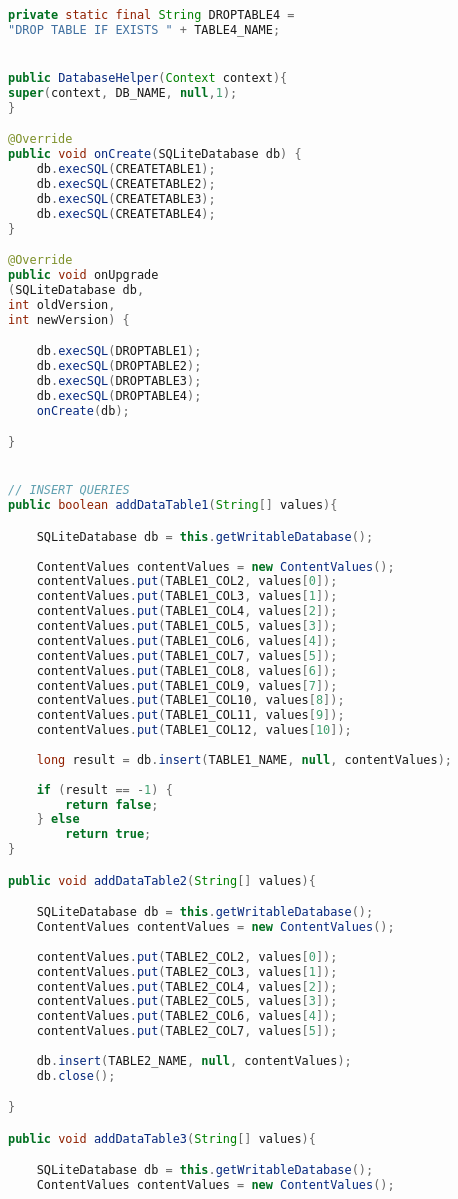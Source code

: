 \begin{lstlisting}[language=java, caption={Clase DatabaseHelper, crea la base de datos de no existir y contiene las consultas e inserciones a la misma}, captionpos=b, basicstyle=\small]
private static final String DROPTABLE4 = 
"DROP TABLE IF EXISTS " + TABLE4_NAME;


public DatabaseHelper(Context context){
super(context, DB_NAME, null,1);
}

@Override
public void onCreate(SQLiteDatabase db) {
	db.execSQL(CREATETABLE1);
	db.execSQL(CREATETABLE2);
	db.execSQL(CREATETABLE3);
	db.execSQL(CREATETABLE4);
}

@Override
public void onUpgrade
(SQLiteDatabase db, 
int oldVersion, 
int newVersion) {

	db.execSQL(DROPTABLE1);
	db.execSQL(DROPTABLE2);
	db.execSQL(DROPTABLE3);
	db.execSQL(DROPTABLE4);
	onCreate(db);

}


// INSERT QUERIES
public boolean addDataTable1(String[] values){

	SQLiteDatabase db = this.getWritableDatabase();
	
	ContentValues contentValues = new ContentValues();
	contentValues.put(TABLE1_COL2, values[0]);
	contentValues.put(TABLE1_COL3, values[1]);
	contentValues.put(TABLE1_COL4, values[2]);
	contentValues.put(TABLE1_COL5, values[3]);
	contentValues.put(TABLE1_COL6, values[4]);
	contentValues.put(TABLE1_COL7, values[5]);
	contentValues.put(TABLE1_COL8, values[6]);
	contentValues.put(TABLE1_COL9, values[7]);
	contentValues.put(TABLE1_COL10, values[8]);
	contentValues.put(TABLE1_COL11, values[9]);
	contentValues.put(TABLE1_COL12, values[10]);
	
	long result = db.insert(TABLE1_NAME, null, contentValues);
	
	if (result == -1) {
		return false;
	} else
		return true;
}

public void addDataTable2(String[] values){

	SQLiteDatabase db = this.getWritableDatabase();
	ContentValues contentValues = new ContentValues();
	
	contentValues.put(TABLE2_COL2, values[0]);
	contentValues.put(TABLE2_COL3, values[1]);
	contentValues.put(TABLE2_COL4, values[2]);
	contentValues.put(TABLE2_COL5, values[3]);
	contentValues.put(TABLE2_COL6, values[4]);
	contentValues.put(TABLE2_COL7, values[5]);
	
	db.insert(TABLE2_NAME, null, contentValues);
	db.close();

}

public void addDataTable3(String[] values){

	SQLiteDatabase db = this.getWritableDatabase();
	ContentValues contentValues = new ContentValues();
	

\end{lstlisting}
